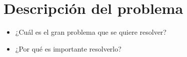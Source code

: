 \section{Descripción del problema}

\begin{tcolorbox}[colback=yellow!10!white,colframe=red!75!black,title=Recomendaciones]
  \begin{itemize}
      \item ¿Cuál es el gran problema que se quiere resolver?
      \item ¿Por qué es importante resolverlo?
  \end{itemize}
\end{tcolorbox}

\pagebreak